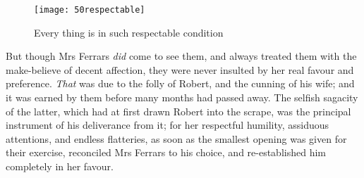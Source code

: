 \begin{figure}[tbph]
\centering
\texttt{[image: 50respectable]}
\caption{Every thing is in such respectable condition}
\end{figure}

But though Mrs Ferrars \textit{did} come to see them, and always treated them with the make-believe of decent affection, they were never insulted by her real favour and preference. \textit{That} was due to the folly of Robert, and the cunning of his wife; and it was earned by them before many months had passed away. The selfish sagacity of the latter, which had at first drawn Robert into the scrape, was the principal instrument of his deliverance from it; for her respectful humility, assiduous attentions, and endless flatteries, as soon as the smallest opening was given for their exercise, reconciled Mrs Ferrars to his choice, and re-established him completely in her favour.

